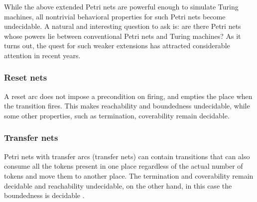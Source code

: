 While the above extended Petri nets are powerful enough to simulate Turing machines, all nontrivial behavioral properties for such Petri nets become undecidable. A natural and interesting question to ask is: are there Petri nets whose powers lie between conventional Petri nets and Turing machines? As it turns out, the quest for such weaker extensions has attracted considerable attention in recent years.

\subsubsection{Reset nets} %
\label{ssub:reset_nets}

A  reset arc does not impose a precondition on firing, and empties the place when the transition fires. This makes reachability and boundedness undecidable, while some other properties, such as termination, coverability remain decidable.


\subsubsection{Transfer nets} %
\label{ssub:transfer_nets}

 Petri nets with transfer arcs (transfer nets) can contain transitions that can also consume all the tokens present in one place regardless of the actual number of tokens and move them to another place. The termination and coverability remain decidable and reachability undecidable, on the other hand, in this case the boundedness is decidable \cite{Dufourd98Reset}.


